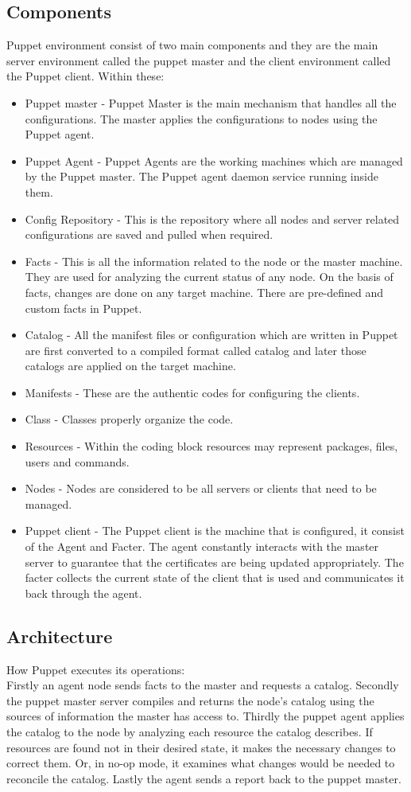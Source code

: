 \documentclass[a4paper, 12pt]{article}
\begin{document}
\subsection{Components}
Puppet environment consist of two main components and they are the main server environment called the puppet master and the client environment called the Puppet client. Within these:
\begin{itemize}
\item
Puppet master - Puppet Master is the main mechanism that handles all the configurations. The master applies the configurations to nodes using the Puppet agent.
\item
Puppet Agent - Puppet Agents are the working machines which are managed by the Puppet master. The Puppet agent daemon service running inside them.
\item
Config Repository - This is the repository where all nodes and server related configurations are saved and pulled when required.
\item
Facts - This  is all the information related to the node or the master machine. They are used for analyzing the current status of any node. On the basis of facts, changes are done on any target machine. There are pre-defined and custom facts in Puppet.
\item
Catalog - All the manifest files or configuration which are written in Puppet are first converted to a compiled format called catalog and later those catalogs are applied on the target machine.
\item
Manifests - These are the authentic codes for configuring the clients.
\item
Class - Classes properly organize the code. 
\item
Resources - Within the coding block resources may represent packages, files, users and commands.
\item
Nodes - Nodes are considered to be all servers or clients that need to be managed.
\item
Puppet client - The Puppet client is the machine that is configured, it consist of the Agent and Facter. The agent constantly interacts with the master server to guarantee that the certificates are being updated appropriately. The facter collects the current state of the client that is used and communicates it back through the agent.

\end{itemize}


\subsection{Architecture}
How Puppet executes its operations:\\
Firstly an agent node sends facts to the master and requests a catalog. Secondly the puppet master server compiles and returns the node’s catalog using the sources of information the master has access to.
Thirdly the puppet agent applies the catalog to the node by analyzing each resource the catalog describes. If resources are found not in their desired state, it makes the necessary changes to correct them. Or, in no-op mode, it examines what changes would be needed to reconcile the catalog.
Lastly the agent sends a report back to the puppet master.
\end{document}

